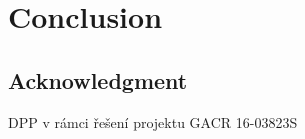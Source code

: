 \documentclass{book}
\theoremstyle{definition}
\numberwithin{equation}{section}
\numberwithin{table}{section}
\begin{document}

\newpage

\newpage

\newpage

\newpage


\newpage

\newpage


\chapter{Conclusion}
\label{ch:conclusion}


\section*{Acknowledgment}
 DPP v rámci řešení projektu GACR 16-03823S







\begin{appendix}
	

	
\end{appendix}
\end{document}
